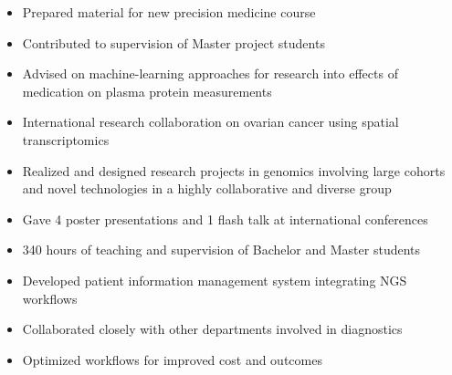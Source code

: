 \documentclass[9pt,a4paper,ragged2e,withhyper]{altacv}
\begin{document}
\begin{paracol}{2}
\begin{itemize}
  \item Prepared material for new precision medicine course
  \item Contributed to supervision of Master project students
  \item Advised on machine-learning approaches for research into effects of medication on plasma protein measurements
\end{itemize}
\divider

\begin{itemize}
  \item International research collaboration on ovarian cancer using spatial transcriptomics
\end{itemize}

\divider

\begin{itemize}
  \item Realized and designed research projects in genomics involving large cohorts and novel technologies in a highly collaborative and diverse group
  \item Gave 4 poster presentations and 1 flash talk at international conferences
  \item 340 hours of teaching and supervision of Bachelor and Master students
\end{itemize}
\divider

\begin{itemize}
  \item Developed patient information management system integrating NGS workflows
  \item Collaborated closely with other departments involved in diagnostics
  \item Optimized workflows for improved cost and outcomes
\end{itemize}


\end{paracol}
\end{document}
